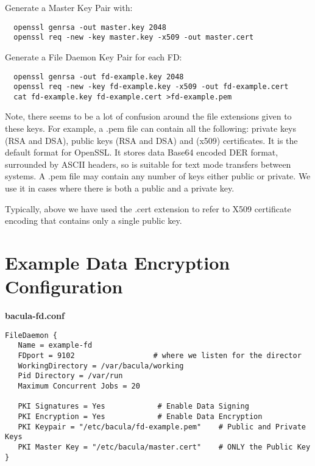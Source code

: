 Generate a Master Key Pair with:

\footnotesize
\begin{verbatim}
  openssl genrsa -out master.key 2048
  openssl req -new -key master.key -x509 -out master.cert
\end{verbatim}
\normalsize

Generate  a File Daemon Key Pair for each FD:

\footnotesize
\begin{verbatim}
  openssl genrsa -out fd-example.key 2048
  openssl req -new -key fd-example.key -x509 -out fd-example.cert
  cat fd-example.key fd-example.cert >fd-example.pem
\end{verbatim}
\normalsize

Note, there seems to be a lot of confusion around the file extensions given
to these keys.  For example, a .pem file can contain all the following:
private keys (RSA and DSA), public keys (RSA and DSA) and (x509) certificates. 
It is the default format for OpenSSL. It stores data Base64 encoded DER format,
surrounded by ASCII headers, so is suitable for text mode transfers between
systems. A .pem file may contain any number of keys either public or
private. We use it in cases where there is both a public and a private
key.

Typically, above we have used the .cert extension to refer to X509
certificate encoding that contains only a single public key.


\section{Example Data Encryption Configuration}

{\bf bacula-fd.conf}
\footnotesize
\begin{verbatim}
FileDaemon {
   Name = example-fd
   FDport = 9102                  # where we listen for the director
   WorkingDirectory = /var/bacula/working
   Pid Directory = /var/run
   Maximum Concurrent Jobs = 20
 
   PKI Signatures = Yes            # Enable Data Signing
   PKI Encryption = Yes            # Enable Data Encryption
   PKI Keypair = "/etc/bacula/fd-example.pem"    # Public and Private Keys
   PKI Master Key = "/etc/bacula/master.cert"    # ONLY the Public Key
}
\end{verbatim}
\normalsize
